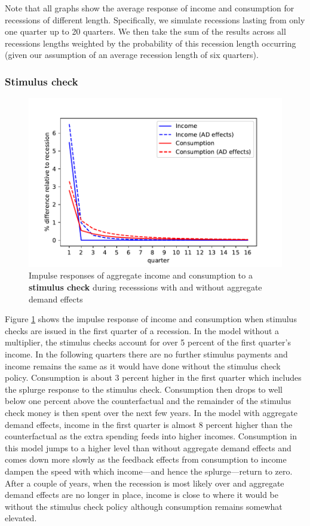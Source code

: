 \documentclass[../HAFiscal]{subfiles}
\begin{document}
Note that all graphs show the average response of income and consumption for recessions of different length. Specifically, we simulate recessions lasting from only one quarter up to 20 quarters. We then take the sum of the results across all recessions lengths weighted by the probability of this recession length occurring (given our assumption of an average recession length of six quarters).

\subsubsection{Stimulus check} 

\begin{figure}
	\centering
	\includegraphics[width=0.8\linewidth]{Code/HA-Models/FromPandemicCode/Figures/recession_Check_relrecession}
	\caption{Impulse responses of aggregate income and consumption to a \textbf{stimulus check} during recesssions with and without aggregate demand effects}
	\label{fig:recessioncheckrelrecession}
\end{figure}

Figure \ref{fig:recessioncheckrelrecession} shows the impulse response of income and consumption when stimulus checks are issued in the first quarter of a recession. In the model without a multiplier, the stimulus checks account for over 5 percent of the first quarter's income. In the following quarters there are no further stimulus payments and income remains the same as it would have done without the stimulus check policy. Consumption is about 3 percent higher in the first quarter which includes the splurge response to the stimulus check. Consumption then drops to well below one percent above the counterfactual and the remainder of the stimulus check money is then spent over the next few years. In the model with aggregate demand effects, income in the first quarter is almost 8 percent higher than the counterfactual as the extra spending feeds into higher incomes. Consumption in this model jumps to a higher level than without aggregate demand effects and comes down more slowly as the feedback effects from consumption to income dampen the speed with which income---and hence the splurge---return to zero. After a couple of years, when the recession is most likely over and aggregate demand effects are no longer in place, income is close to where it would be without the stimulus check policy although consumption remains somewhat elevated.
\end{document}
